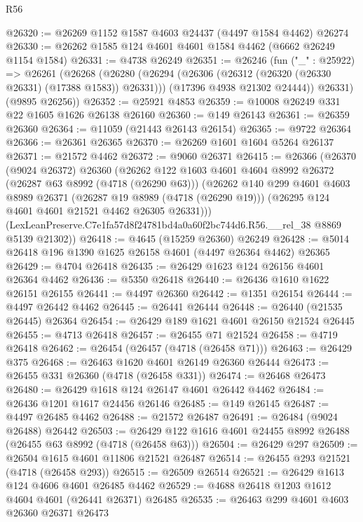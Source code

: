 \begin{lexlean}{R56}
\begin{coremodule}
@26320 := @26269 @1152 @1587 @4603 @24437 (@4497 @1584 @4462) @26274
@26330 := @26262 @1585 @124 @4601 @4601 @1584 @4462 (@6662 @26249 @1154 @1584)
@26331 := @4738 @26249
@26351 := @26246
    (fun ("_" : @25922) =>
    @26261
      (@26268
        (@26280
          (@26294 (@26306 (@26312 (@26320 (@26330 @26331) (@17388 @1583)) @26331)))
          (@17396 @4938 @21302 @24444))
        @26331)
      (@9895 @26256))
@26352 := @25921 @4853
@26359 := @10008 @26249 @331 @22 @1605 @1626 @26138 @26160
@26360 := @149 @26143
@26361 := @26359 @26360
@26364 := @11059 (@21443 @26143 @26154)
@26365 := @9722 @26364
@26366 := @26361 @26365
@26370 := @26269 @1601 @1604 @5264 @26137
@26371 := @21572 @4462
@26372 := @9060 @26371
@26415 := @26366
    (@26370
      (@9024 @26372)
      @26360
      (@26262
        @122
        @1603
        @4601
        @4604
        @8992
        @26372
        (@26287 @63 @8992 (@4718 (@26290 @63)))
        (@26262
          @140
          @299
          @4601
          @4603
          @8989
          @26371
          (@26287 @19 @8989 (@4718 (@26290 @19)))
          (@26295 @124 @4601 @4601 @21521 @4462 @26305 @26331)))
      (LexLeanPreserve.C7e1fa57d8f24781bd4a0a60f2bc744d6.R56.__rel_38 @8869 @5139 @21302))
@26418 := @4645 (@15259 @26360) @26249
@26428 := @5014 @26418 @196 @1390 @1625 @26158 @4601 (@4497 @26364 @4462) @26365
@26429 := @4704 @26418
@26435 := @26429 @1623 @124 @26156 @4601 @26364 @4462
@26436 := @5350 @26418
@26440 := @26436 @1610 @1622 @26151 @26155
@26441 := @4497 @26360
@26442 := @1351 @26154
@26444 := @4497 @26442 @4462
@26445 := @26441 @26444
@26448 := @26440 (@21535 @26445) @26364
@26454 := @26429 @189 @1621 @4601 @26150 @21524 @26445
@26455 := @4713 @26418
@26457 := @26455 @71 @21524
@26458 := @4719 @26418
@26462 := @26454 (@26457 (@4718 (@26458 @71)))
@26463 := @26429 @375
@26468 := @26463 @1620 @4601 @26149 @26360 @26444
@26473 := @26455 @331 @26360 (@4718 (@26458 @331))
@26474 := @26468 @26473
@26480 := @26429 @1618 @124 @26147 @4601 @26442 @4462
@26484 := @26436 @1201 @1617 @24456 @26146
@26485 := @149 @26145
@26487 := @4497 @26485 @4462
@26488 := @21572 @26487
@26491 := @26484 (@9024 @26488) @26442
@26503 := @26429 @122 @1616 @4601 @24455 @8992 @26488 (@26455 @63 @8992 (@4718 (@26458 @63)))
@26504 := @26429 @297
@26509 := @26504 @1615 @4601 @11806 @21521 @26487
@26514 := @26455 @293 @21521 (@4718 (@26458 @293))
@26515 := @26509 @26514
@26521 := @26429 @1613 @124 @4606 @4601 @26485 @4462
@26529 := @4688 @26418 @1203 @1612 @4604 @4601 (@26441 @26371) @26485
@26535 := @26463 @299 @4601 @4603 @26360 @26371 @26473

\end{coremodule}
\end{lexlean}
